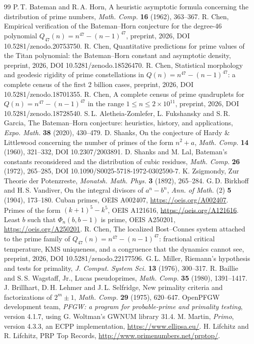 \documentclass[11pt,a4paper]{article}
\theoremstyle{remark}
\begin{document}
\begin{thebibliography}{99}
 P.\,T. Bateman and R.\,A. Horn, A heuristic asymptotic formula concerning the distribution of prime numbers, \emph{Math. Comp.} \textbf{16} (1962), 363--367.
 R. Chen, Empirical verification of the Bateman--Horn conjecture for the degree-46 polynomial $Q_{47}(n)=n^{47}-(n-1)^{47}$, preprint, 2026, DOI 10.5281/zenodo.20753750.
 R. Chen, Quantitative predictions for prime values of the Titan polynomial: the Bateman--Horn constant and asymptotic density, preprint, 2026, DOI 10.5281/zenodo.18526470.
 R. Chen, Statistical morphology and geodesic rigidity of prime constellations in $Q(n)=n^{47}-(n-1)^{47}$: a complete census of the first 2 billion cases, preprint, 2026, DOI 10.5281/zenodo.18701355.
 R. Chen, A complete census of prime quadruplets for $Q(n)=n^{47}-(n-1)^{47}$ in the range $1\le n\le2\times10^{11}$, preprint, 2026, DOI 10.5281/zenodo.18728540.
 S.\,L. Aletheia-Zomlefer, L. Fukshansky and S.\,R. Garcia, The Bateman--Horn conjecture: heuristics, history, and applications, \emph{Expo. Math.} \textbf{38} (2020), 430--479.
 D. Shanks, On the conjecture of Hardy \& Littlewood concerning the number of primes of the form $n^2+a$, \emph{Math. Comp.} \textbf{14} (1960), 321--332, DOI 10.2307/2003891.
 D. Shanks and M. Lal, Bateman's constants reconsidered and the distribution of cubic residues, \emph{Math. Comp.} \textbf{26} (1972), 265--285, DOI 10.1090/S0025-5718-1972-0302590-7.
 K. Zsigmondy, Zur Theorie der Potenzreste, \emph{Monatsh. Math. Phys.} \textbf{3} (1892), 265--284.
 G.\,D. Birkhoff and H.\,S. Vandiver, On the integral divisors of $a^n-b^n$, \emph{Ann. of Math.} (2) \textbf{5} (1904), 173--180.
 Cuban primes, OEIS A002407, \url{https://oeis.org/A002407}.
 Primes of the form $(k+1)^5-k^5$, OEIS A121616, \url{https://oeis.org/A121616}.
 Least $b$ such that $\Phi_n(b,b-1)$ is prime, OEIS A250201, \url{https://oeis.org/A250201}.
 R. Chen, The localized Bost--Connes system attached to the prime family of $Q_{47}(n)=n^{47}-(n-1)^{47}$: fractional critical temperature, KMS uniqueness, and a congruence that the dynamics cannot see, preprint, 2026, DOI 10.5281/zenodo.22177596.
 G.\,L. Miller, Riemann's hypothesis and tests for primality, \emph{J. Comput. System Sci.} \textbf{13} (1976), 300--317.
 R. Baillie and S.\,S. Wagstaff, Jr., Lucas pseudoprimes, \emph{Math. Comp.} \textbf{35} (1980), 1391--1417.
 J. Brillhart, D.\,H. Lehmer and J.\,L. Selfridge, New primality criteria and factorizations of $2^m\pm1$, \emph{Math. Comp.} \textbf{29} (1975), 620--647.
 OpenPFGW development team, \emph{PFGW: a program for probable-prime and primality testing}, version 4.1.7, using G. Woltman's GWNUM library 31.4.
 M. Martin, \emph{Primo}, version 4.3.3, an ECPP implementation, \url{https://www.ellipsa.eu/}.
 H. Lifchitz and R. Lifchitz, PRP Top Records, \url{http://www.primenumbers.net/prptop/}.
\end{thebibliography}
\end{document}

